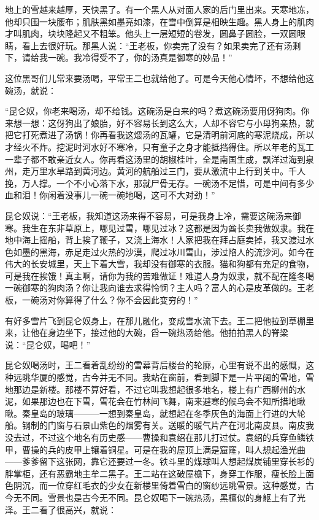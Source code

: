 地上的雪越来越厚，天快黑了。有一个黑人从对面人家的后门里出来。天寒地冻，他却只围一块腰布；肌肤黑如墨亮如漆，在雪中倒算是相映生趣。黑人身上的肌肉才叫肌肉，块块隆起又不粗笨。他头上一层短短的卷发，圆鼻子圆脸，一双圆眼睛，看上去很好玩。那黑人说：“王老板，你卖完了没有？如果卖完了还有汤剩下，请给我一碗。我冷得受不了，你的汤真是御寒的妙品！” 

这位黑哥们儿常来要汤喝，平常王二也就给他了。可是今天他心情坏，不想给他这碗汤，就说： 

“昆仑奴，你老来喝汤，却不给钱。这碗汤是白来的吗？煮这碗汤要用伢狗肉。你来想一想：这伢狗出了娘胎，好不容易长到这么大，人却不容它与小母狗亲热，就把它打死煮进了汤锅！你再看我这煨汤的瓦罐，它是清明前河底的寒泥烧成，所以才经火不炸。挖泥时河水好不寒冷，只有童子之身才能抵挡得住。所以年老的瓦工一辈子都不敢亲近女人。你再看这汤里的胡椒桂叶，全是南国生成，飘洋过海到泉州，走万里水旱路到黄河边。黄河的航船过三门，要从激流中上行到关中。千人挽，万人撑。一个不小心落下水，那就尸骨无存。一碗汤不足惜，可是中间有多少血和泪！你闲着没事儿一碗一碗地喝，这可不大对劲！” 

昆仑奴说：“王老板，我知道这汤来得不容易，可是我身上冷，需要这碗汤来御寒。我生在东非草原上，哪见过雪，哪见过冰？这都是因为酋长卖我做奴隶。我在地中海上摇船，背上挨了鞭子，又浇上海水！人家把我在拜占庭卖掉，我又渡过水色如墨的黑海，赤足走过火热的沙漠，爬过冰川雪山，涉过陷人的流沙河。如今在伟大的长安城里，天上下着大雪，我却没有御寒的衣服。猫和狗都有充足的食物，可是我在挨饿！真主啊，请你为我的苦难做证！难道人身为奴隶，就不配在隆冬喝一碗御寒的狗肉汤？你让我向谁去求得怜悯？主人吗？富人的心是皮革做的。王老板，一碗汤对你算得了什么？你不会因此变穷的！” 

有好多雪片飞到昆仑奴身上，在那儿融化，变成雪水流下去。王二把他拉到草棚里来，让他在身边坐下，接过他的大碗，舀一碗热汤给他。他拍拍黑人的脊梁说：“昆仑奴，喝吧！” 

昆仑奴喝汤时，王二看着乱纷纷的雪幕背后楼台的轮廓，心里有说不出的感慨，这种远眺华厦的感觉，古今并无不同。我站在窗前，看到脚下是一片平阔的雪地，雪地那边是新楼。那楼不算好看，不过它叫我想起很多地名，楼上有广西柳州的水泥，如果那边也在下雪，雪花会在竹林间飞舞，南来避寒的候鸟会不知所措地瞅瞅。秦皇岛的玻璃———一想到秦皇岛，就想起在冬季灰色的海面上行进的大轮船。钢制的门窗与石景山紫色的烟雾有关。送暖的暖气片产在河北南皮县。南皮我没去过，不过这个地名有历史感——曹操和袁绍在那儿打过仗。袁绍的兵穿鱼鳞铁甲，曹操的兵的皮甲上镶着铜星。可是在我的屋顶上满是窟窿，叫人想起渔光曲——爹爹留下这张网，靠它还要过一冬。铁斗里的煤球叫人想起煤炭铺里穿长衫的胖掌柜，还有恶霸地主牟二黑子。王二站在这破屋檐下，身穿工作服，瘦长脸上面色阴沉，而一位穿红毛衣的少女在新楼里倚着雪白的窗纱远眺雪景。这种感觉，古今无不同。雪景也是古今无不同。昆仑奴喝下一碗热汤，黑檀似的身躯上有了光泽。王二看了很高兴，就说： 

